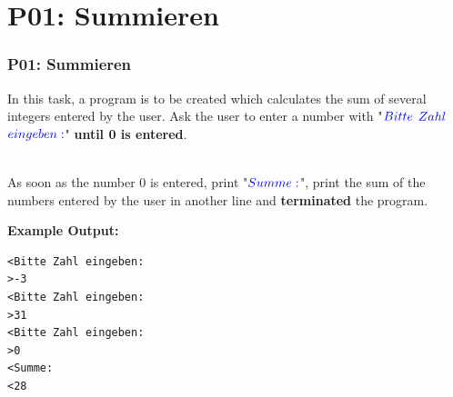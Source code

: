 \documentclass[handout, navsym]{tum-presentation}
\numberwithin{equation}{section}
\begin{document}
\section{P01: Summieren}
\begin{frame}[fragile]
  \frametitle{P01: Summieren}
  \vspace*{\fill}
\large  In this task, a program is to be created which calculates the sum of several integers entered by the user. Ask the user to enter a number with "$\color{blue} Bitte$ $\color{blue}Zahl$ $\color{blue} eingeben:$" \textbf{until 0 is entered}. \par
~\\
As soon as the number 0 is entered, print "$\color{blue} Summe:$", print the sum of the numbers entered by the user in another line  and \textbf{terminated} the program.\par
\bigskip
\textbf{\large Example Output:}
\center
\begin{lstlisting}
<Bitte Zahl eingeben:
>-3
<Bitte Zahl eingeben:
>31
<Bitte Zahl eingeben:
>0
<Summe:
<28
\end{lstlisting}

\vspace*{\fill}
\end{frame}
\end{document}
